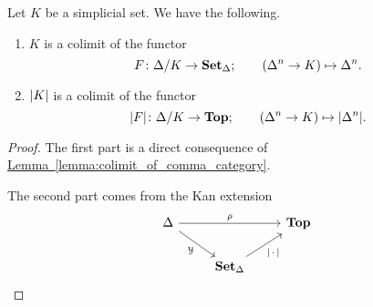 \documentclass[main.tex]{subfiles}
\begin{document}
\begin{lemma}
  \label{lemma:geometrical_realization_is_a_colimit}
  Let $K$ be a simplicial set. We have the following.
  \begin{enumerate}
    \item $K$ is a colimit of the functor
      \begin{equation*}
        F\colon \Delta/K \to \operatorname{\mathbf{Set}_{\Delta}};\qquad (\Delta^{n} \to K) \mapsto \Delta^{n}.
      \end{equation*}

    \item ${| K |}$ is a colimit of the functor
      \begin{equation*}
        {| F |}\colon \Delta/K \to \mathbf{Top};\qquad (\Delta^{n} \to K) \mapsto {| \Delta^{n} |}.
      \end{equation*}
  \end{enumerate}
\end{lemma}
\begin{proof}
  The first part is a direct consequence of \hyperref[lemma:colimit_of_comma_category]{Lemma~\ref*{lemma:colimit_of_comma_category}}.

  The second part comes from the Kan extension
  \begin{equation*}
    \begin{tikzcd}
      \Delta
      \arrow[rr, "\rho"]
      \arrow[dr, swap, "\mathcal{Y}"]
      && \mathbf{Top}
      \\
      & \SSet
      \arrow[ur, swap, "\abs{\,\cdot\,}"]
    \end{tikzcd}
  \end{equation*}
\end{proof}
\end{document}
